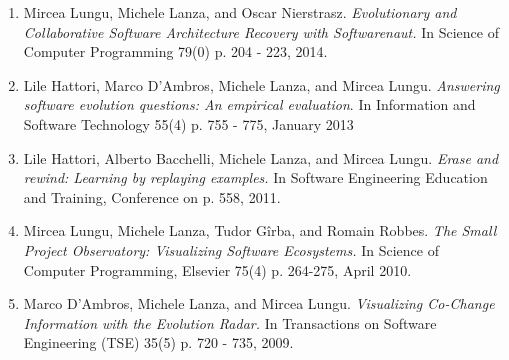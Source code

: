 
\begin{enumerate}
\item Mircea Lungu, Michele Lanza, and Oscar Nierstrasz. \emph{Evolutionary and Collaborative Software Architecture Recovery with Softwarenaut.}  In Science of Computer Programming 79(0) p. 204 - 223, 2014.

\item Lile Hattori, Marco D'Ambros, Michele Lanza, and Mircea Lungu. \emph{Answering software evolution questions: An empirical evaluation}. In Information and Software Technology 55(4) p. 755 - 775, January 2013

\item Lile Hattori, Alberto Bacchelli, Michele Lanza, and Mircea Lungu. \emph{Erase and rewind: Learning by replaying examples.} In Software Engineering Education and Training, Conference on p. 558, 2011.

\item Mircea Lungu, Michele Lanza, Tudor G\^irba, and Romain Robbes. \emph{The Small Project Observatory: Visualizing Software Ecosystems.} In Science of Computer Programming, Elsevier 75(4) p. 264-275, April 2010.

\item Marco D'Ambros, Michele Lanza, and Mircea Lungu. \emph{Visualizing Co-Change Information with the Evolution Radar.} In Transactions on Software Engineering (TSE) 35(5) p. 720 - 735, 2009.
\end{enumerate}




